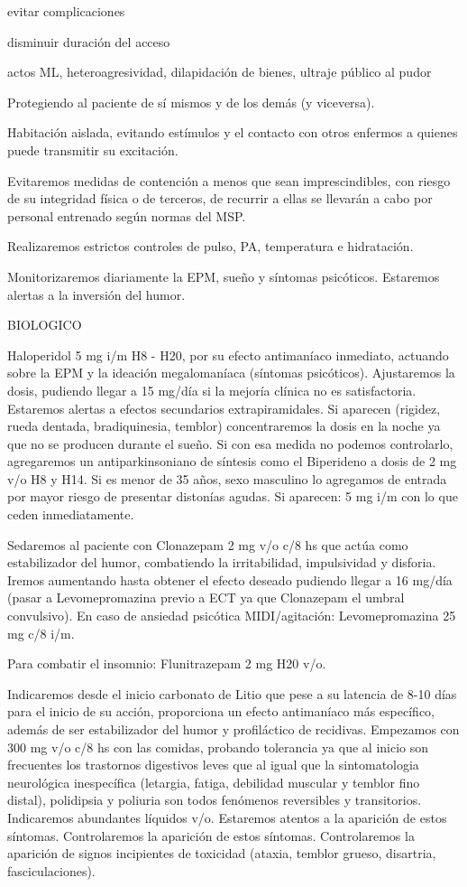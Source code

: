 \documentclass{scrbook}
\begin{document}
evitar complicaciones

disminuir duración del acceso

actos ML, heteroagresividad, dilapidación de bienes, ultraje público al pudor

Protegiendo al paciente de sí mismos y de los demás (y viceversa).

Habitación aislada, evitando estímulos y el contacto con otros enfermos a quienes puede transmitir su excitación.

Evitaremos medidas de contención a menos que sean imprescindibles, con riesgo de su integridad física o de terceros, de recurrir a ellas se llevarán a cabo por personal entrenado según normas del MSP.

Realizaremos estrictos controles de pulso, PA, temperatura e hidratación.

Monitorizaremos diariamente la EPM, sueño y síntomas psicóticos. Estaremos alertas a la inversión del humor.

BIOLOGICO

Haloperidol 5 mg i/m H8 - H20, por su efecto antimaníaco inmediato, actuando sobre la EPM y la ideación megalomaníaca (síntomas psicóticos). Ajustaremos la dosis, pudiendo llegar a 15 mg/día si la mejoría clínica no es satisfactoria. Estaremos alertas a efectos secundarios extrapiramidales. Si aparecen (rigidez, rueda dentada, bradiquinesia, temblor) concentraremos la dosis en la noche ya que no se producen durante el sueño. Si con esa medida no podemos controlarlo, agregaremos un antiparkinsoniano de síntesis como el Biperideno a dosis de 2 mg v/o H8 y H14. Si es menor de 35 años, sexo masculino lo agregamos de entrada por mayor riesgo de presentar distonías agudas. Si aparecen: 5 mg i/m con lo que ceden inmediatamente.

Sedaremos al paciente con Clonazepam 2 mg v/o c/8 hs que actúa como estabilizador del humor, combatiendo la irritabilidad, impulsividad y disforia. Iremos aumentando hasta obtener el efecto deseado pudiendo llegar a 16 mg/día (pasar a Levomepromazina previo a ECT ya que Clonazepam el umbral convulsivo). En caso de ansiedad psicótica MIDI/agitación: Levomepromazina 25 mg c/8 i/m.

Para combatir el insomnio: Flunitrazepam 2 mg H20 v/o.

Indicaremos desde el inicio carbonato de Litio que pese a su latencia de 8-10 días para el inicio de su acción, proporciona un efecto antimaníaco más específico, además de ser estabilizador del humor y profiláctico de recidivas. Empezamos con 300 mg v/o c/8 hs con las comidas, probando tolerancia ya que al inicio son frecuentes los trastornos digestivos leves que al igual que la sintomatologia neurológica inespecífica (letargia, fatiga, debilidad muscular y temblor fino distal), polidipsia y poliuria son todos fenómenos reversibles y transitorios. Indicaremos abundantes líquidos v/o. Estaremos atentos a la aparición de estos síntomas. Controlaremos la aparición de estos síntomas. Controlaremos la aparición de signos incipientes de toxicidad (ataxia, temblor grueso, disartria, fasciculaciones).
\end{document}
